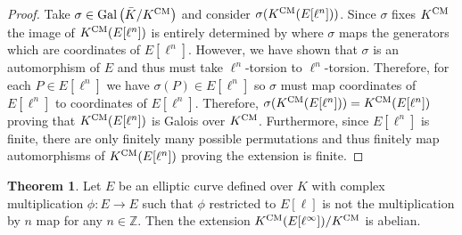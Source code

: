 \documentclass{article}
\newcommand{\Gal}[1]{\mathrm{Gal}\left( #1 \right)}
\newcommand{\Z}{\mathbb{Z}}
\theoremstyle{definition}
\newtheorem{theorem}{Theorem}[section]
\begin{document}
\begin{proof}
Take $\sigma \in \Gal{\bar{K} / K^{\CM}}$ and consider $\sigma(K^{\mathrm{CM}} (E[\ell^n]))$. Since $\sigma$ fixes $K^{\mathrm{CM}}$ the image of $K^{\mathrm{CM}} (E[\ell^n])$ is entirely determined by where $\sigma$ maps the generators which are coordinates of $E[\ell^n]$. However, we have shown that $\sigma$ is an automorphism of $E$ and thus must take $\ell^n$-torsion to $\ell^n$-torsion. Therefore, for each $P \in E[\ell^n]$ we have $\sigma(P) \in E[\ell^n]$ so $\sigma$ must map coordinates of $E[\ell^n]$ to coordinates of $E[\ell^n]$. Therefore, $\sigma(K^{\mathrm{CM}} (E[\ell^n])) = K^{\mathrm{CM}} (E[\ell^n])$ proving that $K^{\mathrm{CM}} (E[\ell^n])$ is Galois over $K^{\mathrm{CM}}$. Furthermore, since $E[\ell^n]$ is finite, there are only finitely many possible permutations and thus finitely map automorphisms of $K^{\mathrm{CM}} (E[\ell^n])$ proving the extension is finite. 
\end{proof}

\begin{theorem}
Let $E$ be an elliptic curve defined over $K$ with complex multiplication $\phi : E \to E$ such that $\phi$ restricted to $E[\ell]$ is not the multiplication by $n$ map for any $n \in \Z$. Then the extension $K^{\mathrm{CM}}(E[\ell^\infty]) / K^{\mathrm{CM}}$ is abelian.  
\end{theorem}
\end{document}
